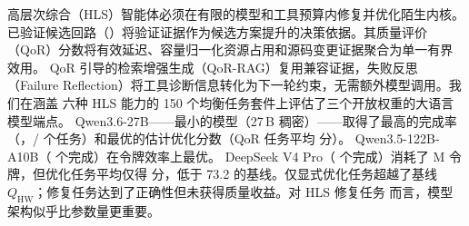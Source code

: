 高层次综合（HLS）智能体必须在有限的模型和工具预算内修复并优化陌生内核。
已验证候选回路（\VCL）将验证证据作为候选方案提升的决策依据。其质量评价
（QoR）分数将有效延迟、容量归一化资源占用和源码变更证据聚合为单一有界效用。
QoR 引导的检索增强生成（QoR-RAG）复用兼容证据，失败反思（Failure
Reflection）将工具诊断信息转化为下一轮约束，无需额外模型调用。我们在涵盖
六种 HLS 能力的 150 个均衡任务套件上评估了三个开放权重的大语言模型端点。
Qwen3.6-27B——最小的模型（27\,B 稠密）——取得了最高的完成率
（\QwenThreeSixSuccessRate，\QwenThreeSixSuccessCount{}/\CorpusTaskCount{}
个任务）和最优的估计优化分数（QoR 任务平均 \QwenThreeSixQorScore{} 分）。
Qwen3.5-122B-A10B（\QwenThreeFiveSuccessCount{} 个完成）在令牌效率上最优。
DeepSeek V4 Pro（\DeepSeekSuccessCount{} 个完成）消耗了 \DeepSeekTokensM{}M
令牌，但优化任务平均仅得 \DeepSeekQorScore{} 分，低于 73.2 的基线。仅显式优化任务超越了基线
$Q_{\mathrm{HW}}$；修复任务达到了正确性但未获得质量收益。对 HLS 修复任务
而言，模型架构似乎比参数量更重要。
